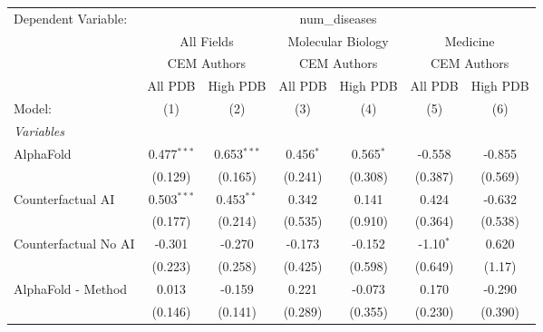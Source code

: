 \begingroup
\centering
\begin{tabular}{lcccccc}
   \tabularnewline \midrule \midrule
   Dependent Variable: & \multicolumn{6}{c}{num\_diseases}\\
 & \multicolumn{2}{c}{All Fields} & \multicolumn{2}{c}{Molecular Biology} & \multicolumn{2}{c}{Medicine} \\
\cmidrule(lr){2-3} \cmidrule(lr){4-5} \cmidrule(lr){6-7}
 & \multicolumn{2}{c}{CEM Authors} & \multicolumn{2}{c}{CEM Authors} & \multicolumn{2}{c}{CEM Authors} \\
\cmidrule(lr){2-3} \cmidrule(lr){4-5} \cmidrule(lr){6-7}
 & \multicolumn{1}{c}{All PDB} & \multicolumn{1}{c}{High PDB} & \multicolumn{1}{c}{All PDB} & \multicolumn{1}{c}{High PDB} & \multicolumn{1}{c}{All PDB} & \multicolumn{1}{c}{High PDB} \\
\cmidrule(lr){2-2} \cmidrule(lr){3-3} \cmidrule(lr){4-4} \cmidrule(lr){5-5} \cmidrule(lr){6-6} \cmidrule(lr){7-7}
   Model:                                                     & (1)           & (2)           & (3)          & (4)          & (5)           & (6)\\  
   \midrule
   \emph{Variables}\\
   AlphaFold                                                  & 0.477$^{***}$ & 0.653$^{***}$ & 0.456$^{*}$  & 0.565$^{*}$  & -0.558        & -0.855\\   
                                                              & (0.129)       & (0.165)       & (0.241)      & (0.308)      & (0.387)       & (0.569)\\   
   Counterfactual AI                                          & 0.503$^{***}$ & 0.453$^{**}$  & 0.342        & 0.141        & 0.424         & -0.632\\   
                                                              & (0.177)       & (0.214)       & (0.535)      & (0.910)      & (0.364)       & (0.538)\\   
   Counterfactual No AI                                       & -0.301        & -0.270        & -0.173       & -0.152       & -1.10$^{*}$   & 0.620\\   
                                                              & (0.223)       & (0.258)       & (0.425)      & (0.598)      & (0.649)       & (1.17)\\   
   AlphaFold - Method                                         & 0.013         & -0.159        & 0.221        & -0.073       & 0.170         & -0.290\\   
                                                              & (0.146)       & (0.141)       & (0.289)      & (0.355)      & (0.230)       & (0.390)\\   

\end{tabular}

